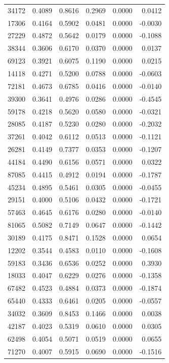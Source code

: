 \begin{tabular}{lrrrrr}
34172 & 0.4089 & 0.8616 & 0.2969 & 0.0000 & 0.0412 \\
17306 & 0.4164 & 0.5902 & 0.0481 & 0.0000 & -0.0030 \\
27229 & 0.4872 & 0.5642 & 0.0179 & 0.0000 & -0.1088 \\
38344 & 0.3606 & 0.6170 & 0.0370 & 0.0000 & 0.0137 \\
69123 & 0.3921 & 0.6075 & 0.1190 & 0.0000 & 0.0215 \\
14118 & 0.4271 & 0.5200 & 0.0788 & 0.0000 & -0.0603 \\
72181 & 0.4673 & 0.6785 & 0.0416 & 0.0000 & -0.0140 \\
39300 & 0.3641 & 0.4976 & 0.0286 & 0.0000 & -0.4545 \\
59178 & 0.4218 & 0.5620 & 0.0580 & 0.0000 & -0.0321 \\
28085 & 0.4187 & 0.5230 & 0.0280 & 0.0000 & -0.2032 \\
37261 & 0.4042 & 0.6112 & 0.0513 & 0.0000 & -0.1121 \\
26281 & 0.4149 & 0.7377 & 0.0353 & 0.0000 & -0.1207 \\
44184 & 0.4490 & 0.6156 & 0.0571 & 0.0000 & 0.0322 \\
87085 & 0.4415 & 0.4912 & 0.0194 & 0.0000 & -0.1787 \\
45234 & 0.4895 & 0.5461 & 0.0305 & 0.0000 & -0.0455 \\
29151 & 0.4000 & 0.5106 & 0.0432 & 0.0000 & -0.1721 \\
57463 & 0.4645 & 0.6176 & 0.0280 & 0.0000 & -0.0140 \\
81065 & 0.5082 & 0.7149 & 0.0647 & 0.0000 & -0.1442 \\
30189 & 0.4175 & 0.8471 & 0.1528 & 0.0000 & 0.0654 \\
12202 & 0.3544 & 0.4583 & 0.0110 & 0.0000 & -0.1608 \\
59183 & 0.3436 & 0.6536 & 0.0252 & 0.0000 & 0.3930 \\
18033 & 0.4047 & 0.6229 & 0.0276 & 0.0000 & -0.1358 \\
67482 & 0.4523 & 0.4884 & 0.0373 & 0.0000 & -0.1874 \\
65440 & 0.4333 & 0.6461 & 0.0205 & 0.0000 & -0.0557 \\
34032 & 0.3609 & 0.8453 & 0.1466 & 0.0000 & 0.0038 \\
42187 & 0.4023 & 0.5319 & 0.0610 & 0.0000 & 0.0305 \\
62498 & 0.4054 & 0.5071 & 0.0519 & 0.0000 & 0.0655 \\
71270 & 0.4007 & 0.5915 & 0.0690 & 0.0000 & -0.1516 \\

\end{tabular}
